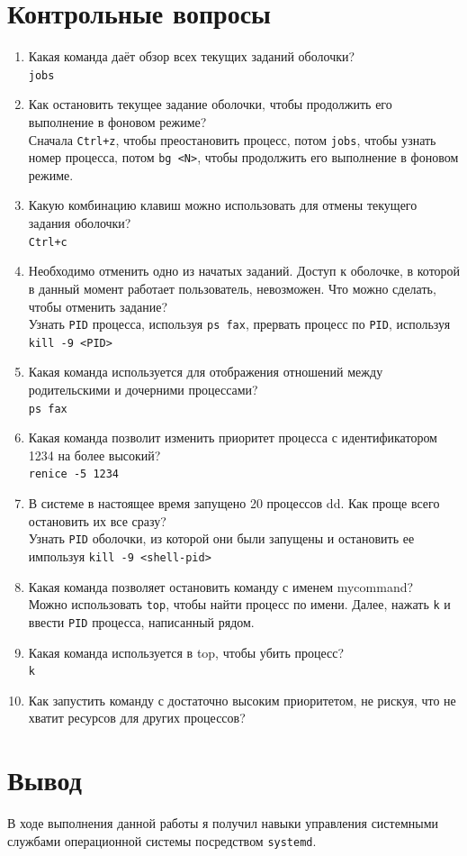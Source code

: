 \documentclass[12pt]{article}
\begin{document}
\section{Контрольные вопросы}
\begin{enumerate}
	\item Какая команда даёт обзор всех текущих заданий оболочки? \\
	      \texttt{jobs}
	\item Как остановить текущее задание оболочки, чтобы продолжить его выполнение в фоновом режиме? \\
	      Сначала \texttt{Ctrl+z}, чтобы преостановить процесс, потом \texttt{jobs}, чтобы узнать номер процесса, потом \texttt{bg <N>}, чтобы продолжить его выполнение в фоновом режиме.
	\item Какую комбинацию клавиш можно использовать для отмены текущего задания оболочки? \\
	      \texttt{Ctrl+c}
	\item Необходимо отменить одно из начатых заданий. Доступ к оболочке, в которой в данный момент работает пользователь, невозможен. Что можно сделать, чтобы отменить задание? \\
	      Узнать \texttt{PID} процесса, используя \texttt{ps fax}, прервать процесс по \texttt{PID}, используя \texttt{kill -9 <PID>}
	\item Какая команда используется для отображения отношений между родительскими и дочерними процессами? \\
	      \texttt{ps fax}
	\item Какая команда позволит изменить приоритет процесса с идентификатором 1234 на более высокий? \\
	      \texttt{renice -5 1234}
	\item В системе в настоящее время запущено 20 процессов dd. Как проще всего остановить их все сразу? \\
	      Узнать \texttt{PID} оболочки, из которой они были запущены и остановить ее импользуя \texttt{kill -9 <shell-pid>}
	\item Какая команда позволяет остановить команду с именем mycommand? \\
	      Можно использовать \texttt{top}, чтобы найти процесс по имени. Далее, нажать \texttt{k} и ввести \texttt{PID} процесса, написанный рядом.
	\item Какая команда используется в top, чтобы убить процесс? \\
	      \texttt{k}
	\item Как запустить команду с достаточно высоким приоритетом, не рискуя, что не хватит ресурсов для других процессов?
\end{enumerate}

\section{Вывод}
В ходе выполнения данной работы я получил навыки управления системными службами операционной системы посредством \texttt{systemd}.
\end{document}

